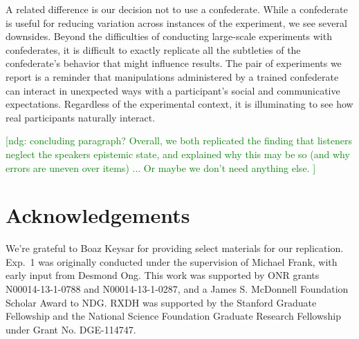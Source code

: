 \documentclass[10pt,letterpaper]{article}
\newcommand{\ndg}[1]{\textcolor{Green}{[ndg: #1]}}
\begin{document}
A related difference is our decision not to use a confederate. While a confederate is useful for reducing variation across instances of the experiment, we see several downsides. Beyond the difficulties of conducting large-scale experiments with confederates, it is difficult to exactly replicate all the subtleties of the confederate's behavior that might influence results. The pair of experiments we report is a reminder that manipulations administered by a trained confederate can interact in unexpected ways with a participant's social and communicative expectations. Regardless of the experimental context, it is illuminating to see how real participants naturally interact.

 

\ndg{concluding paragraph? Overall, we both replicated the finding that listeners neglect the speakers epistemic state, and explained why this may be so (and why errors are uneven over items) ...
Or maybe we don't need anything else.
}

\section{Acknowledgements}

\small We're grateful to Boaz Keysar for providing select materials for our replication. Exp.~1 was originally conducted under the supervision of Michael Frank, with early input from Desmond Ong. This work was supported by ONR grants N00014-13-1-0788 and N00014-13-1-0287,  and a James S. McDonnell Foundation Scholar Award to NDG. RXDH was supported by the Stanford Graduate Fellowship and the National Science Foundation Graduate Research Fellowship under Grant No. DGE-114747. 



\setlength{\bibleftmargin}{.125in}
\setlength{\bibindent}{-\bibleftmargin}


\end{document}
